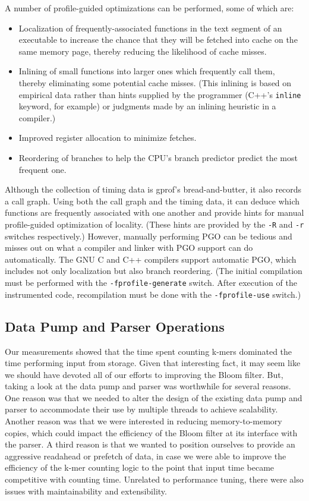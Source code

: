 \documentclass{article}
\begin{document}

A number of profile-guided optimizations can be performed, some of which are:
\begin{itemize}
\item Localization of frequently-associated functions in the text segment of an executable to increase the chance that they will be fetched into cache on the same memory page, thereby reducing the likelihood of cache misses.
\item Inlining of small functions into larger ones which frequently call them, thereby eliminating some potential cache misses. (This inlining is based on empirical data rather than hints supplied by the programmer (C++'s \texttt{inline} keyword, for example) or judgments made by an inlining heuristic in a compiler.)
\item Improved register allocation to minimize fetches.
\item Reordering of branches to help the CPU's branch predictor predict the most frequent one.
\end{itemize}

Although the collection of timing data is gprof's bread-and-butter, it also records a call graph. Using both the call graph and the timing data, it can deduce which functions are frequently associated with one another and provide hints for manual profile-guided optimization of locality. (These hints are provided by the \texttt{-R} and \texttt{-r} switches respectively.) However, manually performing PGO can be tedious and misses out on what a compiler and linker with PGO support can do automatically. The GNU C and C++ compilers support automatic PGO, which includes not only localization but also branch reordering. (The initial compilation must be performed with the \texttt{-fprofile-generate} switch. After execution of the instrumented code, recompilation must be done with the \texttt{-fprofile-use} switch.)

\subsection{Data Pump and Parser Operations}

Our measurements showed that the time spent counting k-mers dominated the time performing input from storage. Given that interesting fact, it may seem like we should have devoted all of our efforts to improving the Bloom filter. But, taking a look at the data pump and parser was worthwhile for several reasons. One reason was that we needed to alter the design of the existing data pump and parser to accommodate their use by multiple threads to achieve scalability. Another reason was that we were interested in reducing memory-to-memory copies, which could impact the efficiency of the Bloom filter at its interface with the parser. A third reason is that we wanted to position ourselves to provide an aggressive readahead or prefetch of data, in case we were able to improve the efficiency of the k-mer counting logic to the point that input time became competitive with counting time. Unrelated to performance tuning, there were also issues with maintainability and extensibility.
\end{document}
